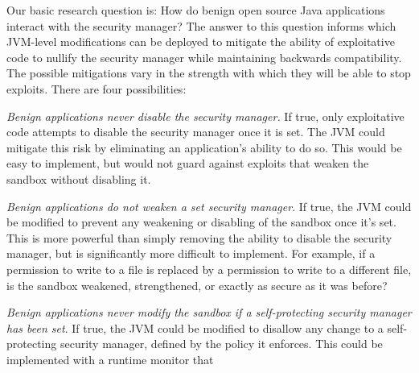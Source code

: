 \documentclass{sig-alternate}
\begin{document}
Our basic research question is: How do benign open source Java applications interact
with the security manager? The answer to this question informs which JVM-level
modifications can be deployed to mitigate the ability of exploitative code to
nullify the security manager while maintaining backwards compatibility.  The
possible mitigations vary in the strength with which they will be able to stop
exploits. 
There are four possibilities:
\begin{flushenum}	\setlength{\parskip}{0pt}
  \setlength{\parsep}{0pt}
  \setlength{\itemsep}{0pt}
\item \textit{Benign applications never disable the security manager.}  If true,
  only exploitative code attempts to disable the security manager once it is set.
  The JVM could mitigate this risk by eliminating an application's ability to
  do so.  This would be easy to implement, but would not guard against exploits
  that weaken the sandbox without disabling it.
\item \textit{Benign applications do not weaken a set security manager}.  If
  true, the JVM could be modified to prevent any weakening or disabling of the 
  sandbox once it's set.  This is more powerful than simply removing the
  ability to disable the security manager, but is significantly more difficult to
  implement.
  For example, if a permission to write to a file is
  replaced by a permission to write to a different file, is the sandbox
  weakened, strengthened, or exactly as secure as it was before?
\item \textit{Benign applications never modify the sandbox if a self-protecting
    security manager has been set}. If true, the JVM could be modified to
  disallow any change to a self-protecting security manager, defined by the
  policy it enforces.  This could be implemented with a runtime monitor that

\end{flushenum}
\end{document}
